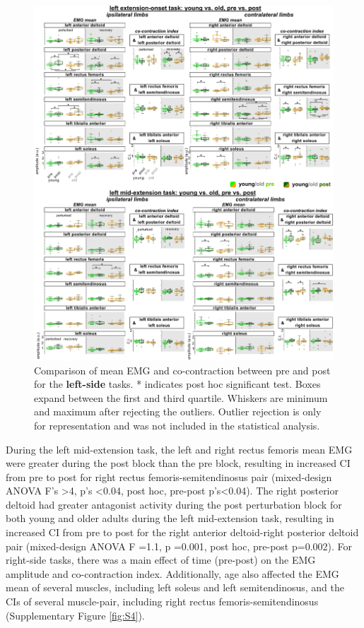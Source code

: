 \documentclass[../thesis_seyed.tex]{subfiles}
\begin{document}
\begin{figure}[H]
    \centering
    \includegraphics[scale=.8]{../img/05_pre-post-comparison.jpg}
    \caption{Comparison of mean EMG and co-contraction between pre and post for the \textbf{left-side} tasks. * indicates post hoc significant test. Boxes expand between the first and third quartile. Whiskers are minimum and maximum after rejecting the outliers. Outlier rejection is only for representation and was not included in the statistical analysis.}
    \label{fig:lpp}
\end{figure}

During the left mid-extension task, the left and right rectus femoris mean EMG were greater during the post block than the pre block, resulting in increased CI from pre to post for right rectus femoris-semitendinosus pair (mixed-design ANOVA F's >4, p's <0.04, post hoc, pre-post p's<0.04). The right posterior deltoid had greater antagonist activity during the post perturbation block for both young and older adults during the left mid-extension task, resulting in increased CI from pre to post for the right anterior deltoid-right posterior deltoid pair (mixed-design ANOVA F =1.1, p =0.001, post hoc, pre-post p=0.002). For right-side tasks, there was a main effect of time (pre-post) on the EMG amplitude and co-contraction index. Additionally, age also affected the EMG mean of several muscles, including left soleus and left semitendinosus, and the CIs of several muscle-pair, including right rectus femoris-semitendinosus (Supplementary Figure \ref{fig:S4}).
\end{document}
